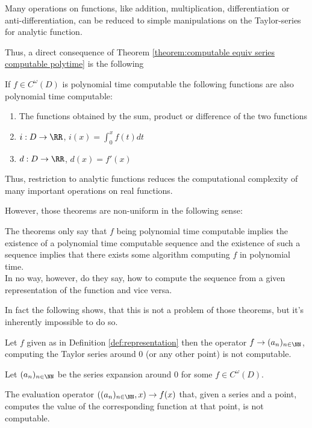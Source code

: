     Many operations on functions, like addition, multiplication, differentiation or anti-differentiation, can 
    be reduced to simple manipulations on the Taylor-series for analytic function.

		Thus, a direct consequence of Theorem \ref{theorem:computable equiv series computable polytime} is the following
		\begin{corollary}
			If $f \in C^\omega(D)$ is polynomial time computable the following functions are also polynomial time computable:
			\begin{enumerate}
        \item The functions obtained by the sum, product or difference of the two functions
				\item $i: D \to \RR$, $i(x) = \int_0^x f(t) dt$
				\item $d: D \to \RR$, $d(x) = f'(x)$ 
			\end{enumerate}
		\end{corollary}
		
    Thus, restriction to analytic functions reduces the computational
    complexity of many important operations on real functions.

		However, those theorems are non-uniform in the following sense:

		The theorems only say that $f$ being polynomial time computable implies the existence of a polynomial time computable sequence
		and the existence of such a sequence implies that there exists some algorithm computing $f$ in polynomial time. \\
		In no way, however, do they say, how to compute the sequence from a given representation of the function and vice versa.

		In fact the following shows, that this is not a problem of those theorems, but it's inherently impossible to do so.
		\begin{theorem}
      Let $f$ given as in Definition \ref{def:representation} then the operator
      $f \to (a_n)_{n \in \NN}$, computing the Taylor series around $0$ (or any
      other point) is not computable.  \end{theorem} 
		\begin{theorem}\label{theorem: evaluation not uniformly computable from powerseries}
      Let $(a_n)_{n \in \NN}$ be the series expansion around $0$ for some $f
      \in C^\omega(D)$.

      The evaluation operator $((a_n)_{n \in \NN}, x) \to
      f(x)$ that, given a series and a point, computes the value of the
      corresponding function at that point, is not computable.
		\end{theorem} 


